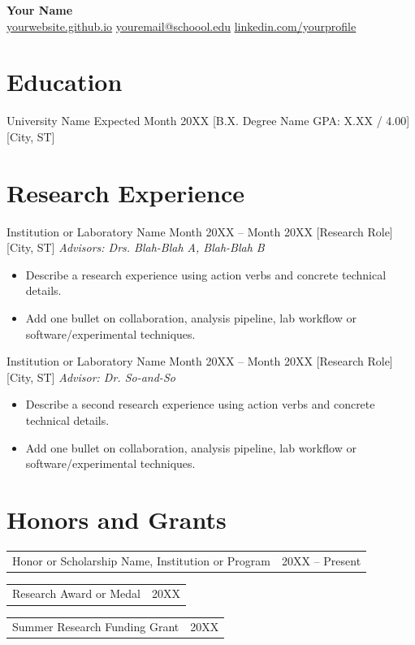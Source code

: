 \documentclass[letterpaper,11pt]{article}
\makeatletter
\newcommand{\resumeSimpleHeading}[2]{%
  \begin{tabularx}{\textwidth}{@{}X>{\RaggedLeft\arraybackslash}p{0.28\textwidth}@{}}
    #1 & #2 \\
  \end{tabularx}
}
\newcommand{\resumeItem}[1]{\item #1}
\makeatother
\begin{document}
\begin{center}
  \textbf{\LARGE Your Name}\\[0.35em]
  \href{https://yourwebsite.github.io/}{\underline{yourwebsite.github.io}} \textbullet{} \href{mailto:youremail@school.edu}{\underline{youremail@schoool.edu}} \textbullet{} \href{https://linkedin.com/in/yourprofile}{\underline{linkedin.com/yourprofile}}
\end{center}

\section*{Education}
\resumeSubheading
  {University Name}
  {Expected Month 20XX}
  [B.X. Degree Name \textbar{} GPA: X.XX / 4.00]
  [City, ST]

\vspace{-1.5em}
\section*{Research Experience}
\resumeSubheading
  {Institution or Laboratory Name}
  {Month 20XX -- Month 20XX}
  [Research Role]
  [City, ST]
\textit{Advisors: Drs. Blah-Blah A, Blah-Blah B}
\begin{itemize}
  \resumeItem{Describe a research experience using action verbs and concrete technical details.}
  \resumeItem{Add one bullet on collaboration, analysis pipeline, lab workflow or software/experimental techniques.}
\end{itemize}

\vspace{0.5em}
\resumeSubheading
  {Institution or Laboratory Name}
  {Month 20XX -- Month 20XX}
  [Research Role]
  [City, ST]
\textit{Advisor: Dr. So-and-So}
\begin{itemize}
  \resumeItem{Describe a second research experience using action verbs and concrete technical details.}
  \resumeItem{Add one bullet on collaboration, analysis pipeline, lab workflow or software/experimental techniques.}
\end{itemize}

\vspace{-1em}
\section*{Honors and Grants}
\resumeSimpleHeading{Honor or Scholarship Name, Institution or Program}{20XX -- Present}
\resumeSimpleHeading{Research Award or Medal}{20XX}
\resumeSimpleHeading{Summer Research Funding Grant}{20XX}
\end{document}
